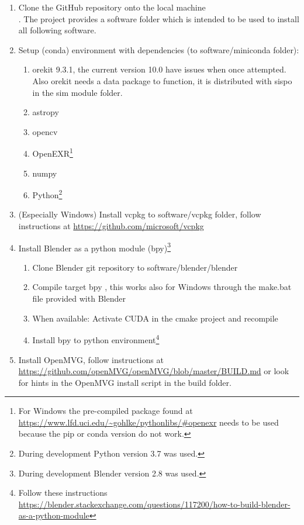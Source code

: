 \begin{enumerate}
    \item Clone the GitHub repository onto the local machine \\ . The project provides a software folder which is intended to be used to install all following software.
    \item Setup (conda) environment with dependencies (to software/miniconda folder):
    \begin{enumerate}
        \item orekit 9.3.1, the current version 10.0 have issues when once attempted. Also orekit needs a data package to function, it is distributed with \gls{sispo} in the sim module folder.
        \item astropy
        \item opencv
        \item OpenEXR\footnote{For Windows the pre-compiled package found at \url{https://www.lfd.uci.edu/~gohlke/pythonlibs/\#openexr} needs to be used because the pip or conda version do not work.}
        \item numpy
        \item Python\footnote{During development Python version 3.7 was used.}
    \end{enumerate}{}
    \item (Especially Windows) Install vcpkg to software/vcpkg folder, follow instructions at \url{https://github.com/microsoft/vcpkg}
    \item Install Blender as a python module (bpy)\footnote{During development Blender version 2.8 was used.}
    \begin{enumerate}
        \item Clone Blender git repository to software/blender/blender \\ 
        \item Compile target bpy , this works also for Windows through the make.bat file provided with Blender
        \item When available: Activate CUDA in the cmake project and recompile
        \item Install bpy to python environment\footnote{Follow these instructions \url{https://blender.stackexchange.com/questions/117200/how-to-build-blender-as-a-python-module}}
    \end{enumerate}{}
    \item Install OpenMVG, follow instructions at \\ \url{https://github.com/openMVG/openMVG/blob/master/BUILD.md} or look for hints in the OpenMVG install script in the build folder.

\end{enumerate}
